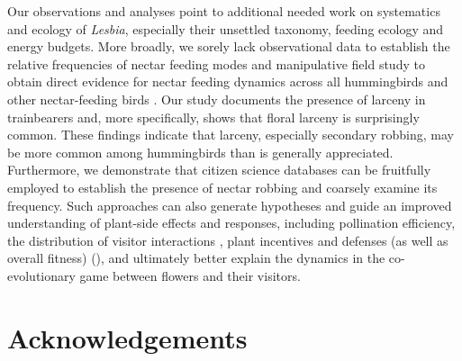 \documentclass[fleqn,10pt,lineno]{wlpeerj}
\begin{document}
%
%

%
%
%


%
%

Our observations and analyses point to additional needed work on systematics and ecology of \textit{Lesbia}, especially their unsettled taxonomy, feeding ecology and energy budgets.  %
More broadly, we sorely lack observational data to establish the relative frequencies of nectar feeding modes and manipulative field study to obtain direct evidence for nectar feeding dynamics across all hummingbirds and other nectar-feeding birds \citep{irwin2010}.
Our study documents the presence of larceny in trainbearers and, more specifically, shows that floral larceny is surprisingly common. 
These findings indicate that larceny, especially secondary robbing, may be more common among hummingbirds than is generally appreciated.
Furthermore, we demonstrate that citizen science databases can be fruitfully employed to establish the presence of nectar robbing and coarsely examine its frequency.
Such approaches can also generate hypotheses and guide an improved understanding of plant-side effects and responses, including pollination efficiency, the distribution of visitor interactions \citep{maloof2000,arizmendi2001}, plant incentives and defenses (as well as overall fitness) (\citealt{pelayo2011}), and ultimately better explain the dynamics in the co-evolutionary game between flowers and their visitors.

\section*{Acknowledgements}
\end{document}
